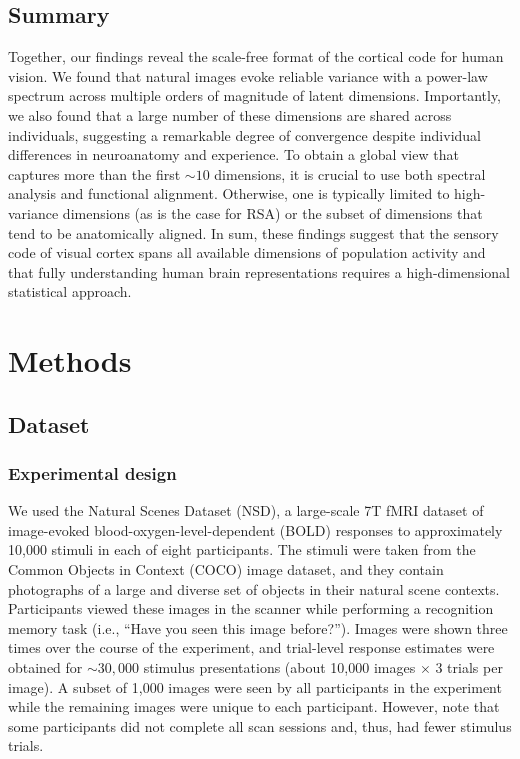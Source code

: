 \documentclass[10pt]{article}
\begin{document}
\subsection{Summary}\label{summary}

Together, our findings reveal the scale-free format of the cortical code
for human vision. We found that natural images evoke reliable variance
with a power-law spectrum across multiple orders of magnitude of latent
dimensions. Importantly, we also found that a large number of these
dimensions are shared across individuals, suggesting a remarkable degree
of convergence despite individual differences in neuroanatomy and
experience. To obtain a global view that captures more than the first
\(\sim 10\) dimensions, it is crucial to use both spectral analysis and
functional alignment. Otherwise, one is typically limited to
high-variance dimensions (as is the case for RSA) or the subset of
dimensions that tend to be anatomically aligned. In sum, these findings
suggest that the sensory code of visual cortex spans all available
dimensions of population activity and that fully understanding human
brain representations requires a high-dimensional statistical approach.

\newpage{}

\section{Methods}\label{methods}

\subsection{Dataset}\label{dataset}

\subsubsection{Experimental design}\label{experimental-design}

We used the Natural Scenes Dataset (NSD), a large-scale 7T fMRI dataset
of image-evoked blood-oxygen-level-dependent (BOLD) responses to
approximately 10,000 stimuli in each of eight participants. The stimuli
were taken from the Common Objects in Context (COCO) image dataset, and
they contain photographs of a large and diverse set of objects in their
natural scene contexts. Participants viewed these images in the scanner
while performing a recognition memory task (i.e., ``Have you seen this
image before?''). Images were shown three times over the course of the
experiment, and trial-level response estimates were obtained for
\(\sim 30,000\) stimulus presentations (about 10,000 images \(\times\) 3
trials per image). A subset of 1,000 images were seen by all
participants in the experiment while the remaining images were unique to
each participant. However, note that some participants did not complete
all scan sessions and, thus, had fewer stimulus trials.
\end{document}
